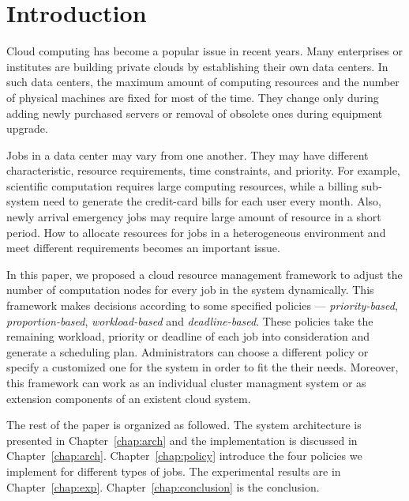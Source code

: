 \chapter{Introduction}\label{chap:intro}

Cloud computing has become a popular issue in recent years.
Many enterprises or institutes are building private clouds by
establishing their own data centers.
In such data centers, the maximum amount of computing resources and the
number of physical machines are fixed for most of the time.
They change only during adding newly purchased servers or removal of
obsolete ones during equipment upgrade.


Jobs in a data center may vary from one another.
They may have different characteristic, resource requirements, time
constraints, and priority.
For example, scientific computation requires large computing resources,
while a billing sub-system need to generate the credit-card bills for
each user every month.
Also, newly arrival emergency jobs may require large amount of resource
in a short period.
How to allocate resources for jobs in a heterogeneous environment and
meet different requirements becomes an important issue.

In this paper, we proposed a cloud resource management framework to
adjust the number of computation nodes for every job in the system
dynamically.
This framework makes decisions according to some specified policies ---
\emph{priority-based}, \emph{proportion-based}, \emph{workload-based}
and \emph{deadline-based}.
These policies take the remaining workload, priority or deadline of each
job into consideration and generate a scheduling plan.
Administrators can choose a different policy or specify a customized one
for the system in order to fit the their needs.
Moreover, this framework can work as an individual cluster managment
system or as extension components of an existent cloud system.

The rest of the paper is organized as followed.
The system architecture is presented in Chapter~\ref{chap:arch} and the
implementation is discussed in Chapter~\ref{chap:arch}.
Chapter~\ref{chap:policy} introduce the four policies we implement for
different types of jobs.
The experimental results are in Chapter~\ref{chap:exp}.
Chapter~\ref{chap:conclusion} is the conclusion.
